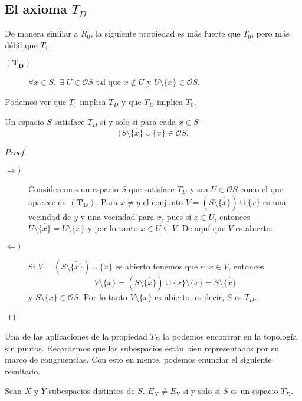 \documentclass{comunicaciones}
\begin{document}
\subsection{El axioma $T_D$}
De manera similar a $R_0$, la siguiente propiedad es más fuerte que $T_0$, pero más débil que $T_1$.

\begin{description}
\item[$(\mathbf{T_D})$] $\forall x\in S,\; \exists\; U\in \mathcal{O}S \mbox{ tal que } x\notin U \mbox{ y } U\setminus\{x\} \in \mathcal{O}S$.
\end{description}

Podemos ver que $T_1$ implica $T_D$ y que $T_D$ implica $T_0$.

\begin{prop}
    Un espacio $S$ satisface $T_D$ si y solo si para cada $x\in S$
    \[
    (S\setminus \overline{\{x\}}\cup \{x\}\in \mathcal{O}S.
    \]
\end{prop}

\begin{proof}
\begin{description}
    \item[$\Rightarrow )$] Consideremos un espacio $S$ que satisface $T_D$ y sea $U\in \mathcal{O}S$ como el que aparece en $(\mathbf{T_D})$. Para $x\neq y$ el conjunto $V=(S\setminus \overline{\{x\}})\cup \{x\}$ es una vecindad de $y$ y una vecindad para $x$, pues si $x\in U$, entonces $U\setminus \overline{\{x\}}=U\setminus \{x\}$ y por lo tanto $x\in U\subseteq V$. De aquí que $V$ es abierto.
    \item[$\Leftarrow )$] Si $V=(S\setminus \overline{\{x\}})\cup \{x\}$ es abierto tenemos que si $x\in V$, entonces 
    \[
    V\setminus \{x\}=(S\setminus \overline{\{x\}})\cup \{x\}\setminus\{x\}=S\setminus \overline{\{x\}}
    \]
    y $S\setminus \overline{\{x\}}\in \mathcal{O}S$. Por lo tanto  $V\setminus \{x\}$ es abierto, es decir, $S$ es $T_D$.
\end{description}
\end{proof}

Una de las aplicaciones de la propiedad $T_D$ la podemos encontrar en la topología sin puntos. Recordemos que los subespacios están bien representados por su marco de congruencias. Con esto en mente, podemos enunciar el siguiente resultado.

\begin{thm}
    Sean $X$ y $Y$ subespacios distintos de $S$. $E_X\neq E_Y$ si y solo si $S$ es un espacio $T_D$.
\end{thm}
\end{document}
